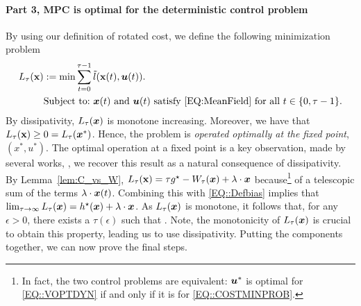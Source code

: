\paragraph{Part 3, MPC is optimal for the deterministic control problem} By using our definition of rotated cost, we define the following minimization problem
\begin{align}
    L_{\tau}(\textbf{x}) &:= \min\sum_{t = 0}^{\tau - 1}\Tilde{l}(\textbf{x}(t), \bm{u}(t)).\nonumber\\
    &\text{Subject to:} \text{ ${\bm{x}}(t)$  and $\bm{u}(t)$ satisfy \eqref{EQ:MeanField} for all $t\in\{0,\tau-1\}$.}
    \label{EQ::COSTMINPROB}
\end{align}
By dissipativity, $L_\tau({\bm{x}})$ is monotone increasing. Moreover, we have that $L_{\tau}(\textbf{x}) \geq 0 = L_{\tau}({\bm{x}}^*)$. Hence, the problem is \emph{operated optimally at the fixed point}, $(x^*, u^*)$. The optimal operation at a fixed point is a key observation, made by several works, \citep{Avrachenkov2024, GGY23b, yan2024, HXCW23}, we recover this result as a natural consequence of dissipativity.
By Lemma~\ref{lem:C_vs_W},
$L_{\tau}(\textbf{x})= \tau g^{\star} - W_{\tau}{({\bm{x}})} + \lambda \cdot {\bm{x}}$ because\footnote{In fact, the two control problems are equivalent: $\bm{u}^*$ is optimal for \eqref{EQ::VOPTDYN} if and only if it is for \eqref{EQ::COSTMINPROB}. } of a telescopic sum of the terms $\lambda \cdot {\bm{x}}(t)$.  Combining this with \eqref{EQ::Defbias} implies that $\lim_{\tau\to\infty}L_{\tau}({\bm{x}}) = h^{\star}({\bm{x}}) + \lambda \cdot {\bm{x}} $.  %
As $L_\tau({\bm{x}})$ is monotone, it follows that, for any $\epsilon > 0$, there exists a $\tau(\epsilon)$ such that %
\redtext{$|\Costmin{\infty}{\bx} - \Costmin{\tau(\epsilon)}{\bx}| < \epsilon$}. Note, the monotonicity of $L_\tau({\bm{x}})$ is crucial to obtain this property, leading us to use dissipativity. Putting the components together, we can now prove the final steps.

